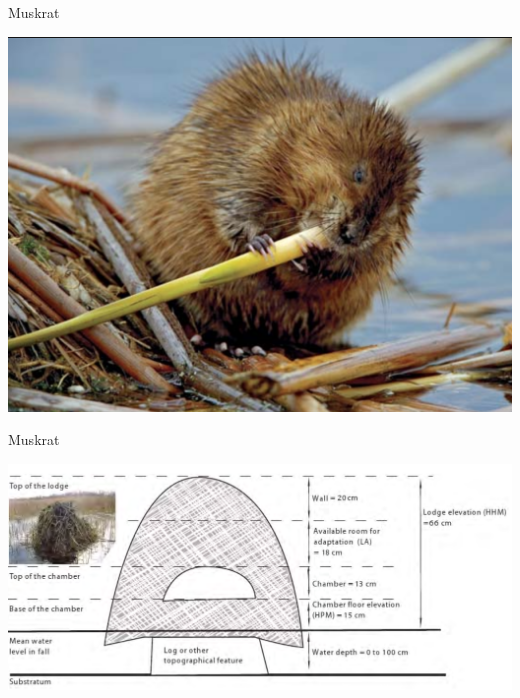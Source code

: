 \documentclass[compress,english]{beamer}
\begin{document}
\begin{frame}{Muskrat}

\begin{center}
\includegraphics[width=0.8\paperwidth]{Muskrat.png}
\end{center}

\end{frame}

\begin{frame}{Muskrat}

\begin{center}
\includegraphics[width=0.8\paperwidth]{MorinMuskrat.png}
\end{center}

\end{frame}
\end{document}
